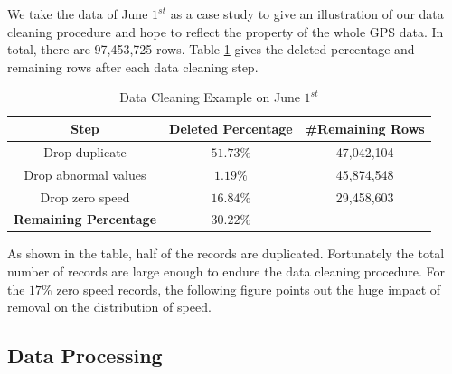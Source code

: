 We take the data of June $1^{st}$ as a case study to give an illustration of our data cleaning procedure and hope to reflect the property of the whole GPS data. In total, there are 97,453,725 rows. Table \ref{data_cleaning_table} gives the deleted percentage and remaining rows after each data cleaning step.

\begin{table}[htb]
  \begin{center}
      \caption{Data Cleaning Example on June $1^{st}$}
      \label{data_cleaning_table}
      \begin{tabular}{ccc}
          \toprule

          \textbf{Step} & \textbf{Deleted Percentage} & \textbf{\#Remaining Rows}\\

          \midrule

          Drop duplicate & $51.73\%$ & 47,042,104\\
          Drop abnormal values & $1.19\%$ & 45,874,548\\
          Drop zero speed & $16.84\%$ & 29,458,603\\

          \cmidrule{1-2}

          \textbf{Remaining Percentage} & $30.22\%$ & ~\\

          \bottomrule
      \end{tabular}
  \end{center}
\end{table}

As shown in the table, half of the records are duplicated. Fortunately the total number of records are large enough to endure the data cleaning procedure. For the $17\%$ zero speed records, the following figure points out the huge impact of removal on the distribution of speed.

\subsection{Data Processing}
